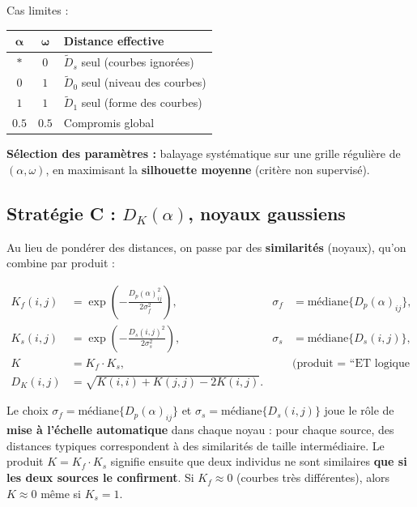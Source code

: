 \documentclass[11pt, a4paper]{article}
\newcommand{\Dp}{D_p}
\newcommand{\DK}{D_K}
\begin{document}
Cas limites :

\begin{center}
\begin{tabular}{ccl}
  \toprule
  $\boldsymbol{\alpha}$ & $\boldsymbol{\omega}$ & \textbf{Distance effective} \\
  \midrule
  $*$ & $0$ & $\tilde{D}_s$ seul (courbes ignorées) \\
  $0$ & $1$ & $\tilde{D}_0$ seul (niveau des courbes) \\
  $1$ & $1$ & $\tilde{D}_1$ seul (forme des courbes) \\
  $0.5$ & $0.5$ & Compromis global \\
  \bottomrule
\end{tabular}
\end{center}

\textbf{Sélection des paramètres :} balayage systématique sur une grille
régulière de $(\alpha, \omega)$, en maximisant la \textbf{silhouette moyenne}
(critère non supervisé).

\subsection{Stratégie C : $\DK(\alpha)$, noyaux gaussiens}

Au lieu de pondérer des distances, on passe par des \textbf{similarités}
(noyaux), qu'on combine par produit :

\begin{align}
  K_f(i,j) &= \exp\!\left( -\frac{\Dp(\alpha)_{ij}^2}{2\sigma_f^2} \right),
  & \sigma_f &= \text{médiane}\{\Dp(\alpha)_{ij}\},  \\[4pt]
  K_s(i,j) &= \exp\!\left( -\frac{D_s(i,j)^2}{2\sigma_s^2} \right),
  & \sigma_s &= \text{médiane}\{D_s(i,j)\},  \\[4pt]
  K &= K_f \cdot K_s, & & \text{(produit = ``ET logique flou'')} \\[4pt]
  \DK(i,j) &= \sqrt{K(i,i) + K(j,j) - 2K(i,j)}.
\end{align}

Le choix $\sigma_f = \text{médiane}\{\Dp(\alpha)_{ij}\}$ et
$\sigma_s = \text{médiane}\{D_s(i,j)\}$ joue le rôle de
\textbf{mise à l'échelle automatique} dans chaque noyau : pour chaque
source, des distances typiques correspondent à des similarités de taille
intermédiaire. Le produit $K = K_f \cdot K_s$ signifie ensuite que deux
individus ne sont similaires \textbf{que si les deux sources le
confirment}. Si $K_f \approx 0$ (courbes très différentes), alors
$K \approx 0$ même si $K_s = 1$.
\end{document}
